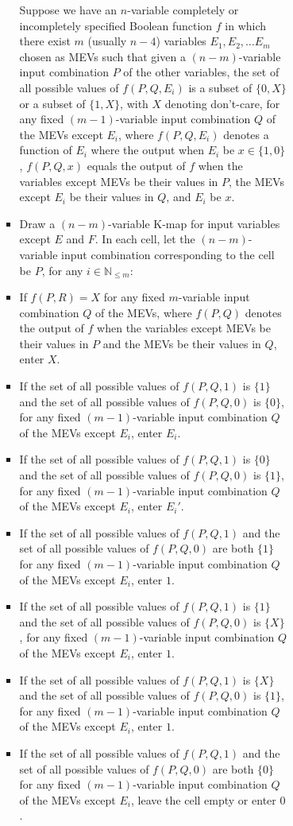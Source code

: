 \documentclass[a4paper,12pt]{article}
\begin{document}
\begin{itemize}
\begin{itemize}
\begin{itemize}
\begin{itemize}
\begin{itemize}
\begin{itemize}
\begin{itemize}
Suppose we have an $n$-variable completely or incompletely specified Boolean function $f$ in which there exist $m$ (usually $n-4$) variables $E_1,E_2,\ldots E_m$ chosen as MEVs such that given a $(n-m)$-variable input combination $P$ of the other variables, the set of all possible values of $f(P,Q,E_i)$ is a subset of $\{0,X\}$ or a subset of $\{1,X\}$, with $X$ denoting don't-care, for any fixed $(m-1)$-variable input combination $Q$ of the MEVs except $E_i$, where $f(P,Q,E_i)$ denotes a function of $E_i$ where the output when $E_i$ be $x\in\{1,0\}$, $f(P,Q,x)$ equals the output of $f$ when the variables except MEVs be their values in $P$, the MEVs except $E_i$ be their values in $Q$, and $E_i$ be $x$.
\ben
\item Draw a $(n-m)$-variable K-map for input variables except $E$ and $F$. In each cell, let the $(n-m)$-variable input combination corresponding to the cell be $P$, for any $i\in\mathbb{N}_{\leq m}$:
\bit
\item If $f(P,R)=X$ for any fixed $m$-variable input combination $Q$ of the MEVs, where $f(P,Q)$ denotes the output of $f$ when the variables except MEVs be their values in $P$ and the MEVs be their values in $Q$, enter $X$.
\item If the set of all possible values of $f(P,Q,1)$ is $\{1\}$ and the set of all possible values of $f(P,Q,0)$ is $\{0\}$, for any fixed $(m-1)$-variable input combination $Q$ of the MEVs except $E_i$, enter $E_i$.
\item If the set of all possible values of $f(P,Q,1)$ is $\{0\}$ and the set of all possible values of $f(P,Q,0)$ is $\{1\}$, for any fixed $(m-1)$-variable input combination $Q$ of the MEVs except $E_i$, enter $E_i'$.
\item If the set of all possible values of $f(P,Q,1)$ and the set of all possible values of $f(P,Q,0)$ are both $\{1\}$ for any fixed $(m-1)$-variable input combination $Q$ of the MEVs except $E_i$, enter $1$.
\item If the set of all possible values of $f(P,Q,1)$ is $\{1\}$ and the set of all possible values of $f(P,Q,0)$ is $\{X\}$, for any fixed $(m-1)$-variable input combination $Q$ of the MEVs except $E_i$, enter $1$.
\item If the set of all possible values of $f(P,Q,1)$ is $\{X\}$ and the set of all possible values of $f(P,Q,0)$ is $\{1\}$, for any fixed $(m-1)$-variable input combination $Q$ of the MEVs except $E_i$, enter $1$.
\item If the set of all possible values of $f(P,Q,1)$ and the set of all possible values of $f(P,Q,0)$ are both $\{0\}$ for any fixed $(m-1)$-variable input combination $Q$ of the MEVs except $E_i$, leave the cell empty or enter $0$.

\end{itemize}
\end{itemize}
\end{itemize}
\end{itemize}
\end{itemize}
\end{itemize}
\end{itemize}
\end{document}
